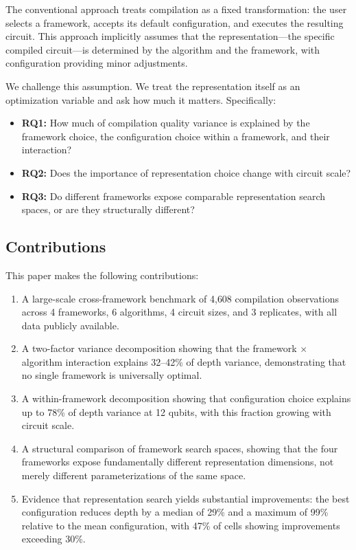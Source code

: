\documentclass[11pt,a4paper]{article}
\begin{document}
The conventional approach treats compilation as a fixed transformation: the user selects a framework, accepts its default configuration, and executes the resulting circuit. This approach implicitly assumes that the representation---the specific compiled circuit---is determined by the algorithm and the framework, with configuration providing minor adjustments.

We challenge this assumption. We treat the representation itself as an optimization variable and ask how much it matters. Specifically:

\begin{itemize}[noitemsep]
\item \textbf{RQ1:} How much of compilation quality variance is explained by the framework choice, the configuration choice within a framework, and their interaction?
\item \textbf{RQ2:} Does the importance of representation choice change with circuit scale?
\item \textbf{RQ3:} Do different frameworks expose comparable representation search spaces, or are they structurally different?
\end{itemize}

\subsection{Contributions}

This paper makes the following contributions:

\begin{enumerate}[noitemsep]
\item A large-scale cross-framework benchmark of 4{,}608 compilation observations across 4 frameworks, 6 algorithms, 4 circuit sizes, and 3 replicates, with all data publicly available.
\item A two-factor variance decomposition showing that the framework $\times$ algorithm interaction explains 32--42\% of depth variance, demonstrating that no single framework is universally optimal.
\item A within-framework decomposition showing that configuration choice explains up to 78\% of depth variance at 12 qubits, with this fraction growing with circuit scale.
\item A structural comparison of framework search spaces, showing that the four frameworks expose fundamentally different representation dimensions, not merely different parameterizations of the same space.
\item Evidence that representation search yields substantial improvements: the best configuration reduces depth by a median of 29\% and a maximum of 99\% relative to the mean configuration, with 47\% of cells showing improvements exceeding 30\%.
\end{enumerate}
\end{document}
